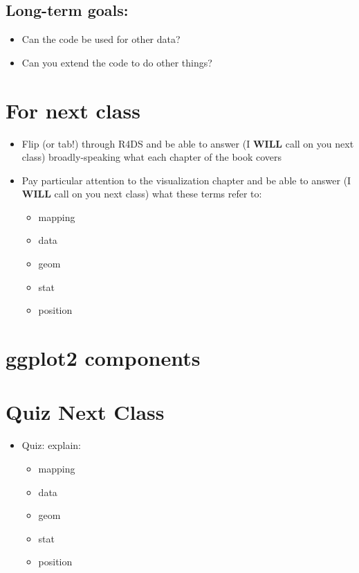\documentclass[
]{book}
\providecommand{\tightlist}{%
  \setlength{\itemsep}{0pt}\setlength{\parskip}{0pt}}
\theoremstyle{definition}
\theoremstyle{definition}
\theoremstyle{definition}
\theoremstyle{definition}
\theoremstyle{remark}
\begin{document}
\hypertarget{long-term-goals}{%
\subsection{Long-term goals:}\label{long-term-goals}}

\begin{itemize}
\tightlist
\item
  Can the code be used for other data?
\item
  Can you extend the code to do other things?
\end{itemize}

\hypertarget{for-next-class}{%
\section{For next class}\label{for-next-class}}

\begin{itemize}
\tightlist
\item
  Flip (or tab!) through R4DS and be able to answer (I \textbf{WILL} call on you next class) broadly-speaking what each chapter of the book covers
\item
  Pay particular attention to the visualization chapter and be able to answer (I \textbf{WILL} call on you next class) what these terms refer to:

  \begin{itemize}
  \tightlist
  \item
    mapping
  \item
    data
  \item
    geom
  \item
    stat
  \item
    position
  \end{itemize}
\end{itemize}

\hypertarget{ggplot2-components}{%
\section{ggplot2 components}\label{ggplot2-components}}

\hypertarget{quiz-next-class}{%
\section{Quiz Next Class}\label{quiz-next-class}}

\begin{itemize}
\tightlist
\item
  Quiz: explain:

  \begin{itemize}
  \tightlist
  \item
    mapping
  \item
    data
  \item
    geom
  \item
    stat
  \item
    position
  \end{itemize}
\end{itemize}
\end{document}
